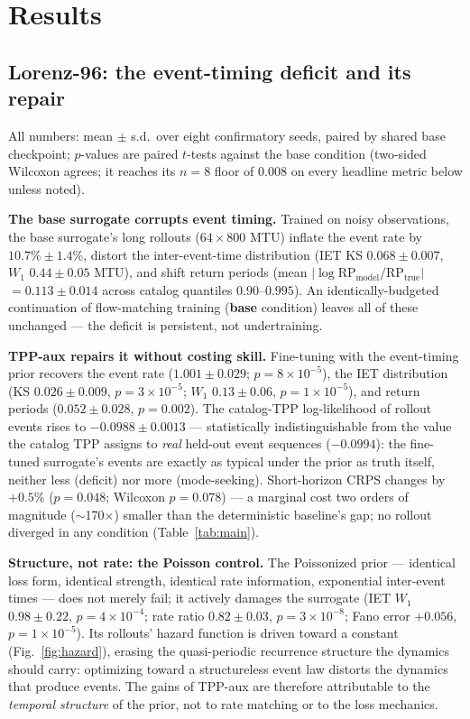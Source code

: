 \documentclass[11pt]{article}
\begin{document}
\section{Results}
\label{sec:results}

\subsection{Lorenz-96: the event-timing deficit and its repair}

All numbers: mean $\pm$ s.d.\ over eight confirmatory seeds, paired by
shared base checkpoint; $p$-values are paired $t$-tests against the base
condition (two-sided Wilcoxon agrees; it reaches its $n{=}8$ floor of
$0.008$ on every headline metric below unless noted).

\textbf{The base surrogate corrupts event timing.} Trained on noisy
observations, the base surrogate's long rollouts ($64 \times 800$ MTU)
inflate the event rate by $10.7\% \pm 1.4\%$, distort the inter-event-time
distribution (IET KS $0.068 \pm 0.007$, $W_1$ $0.44 \pm 0.05$ MTU), and
shift return periods (mean $|\log \mathrm{RP}_{\mathrm{model}} /
\mathrm{RP}_{\mathrm{true}}|$ $= 0.113 \pm 0.014$ across catalog quantiles
$0.90$--$0.995$). An identically-budgeted continuation of flow-matching
training (\textbf{base} condition) leaves all of these unchanged --- the
deficit is persistent, not undertraining.

\textbf{TPP-aux repairs it without costing skill.} Fine-tuning with the
event-timing prior recovers the event rate ($1.001 \pm 0.029$;
$p=8\!\times\!10^{-5}$), the IET distribution (KS $0.026 \pm 0.009$,
$p=3\!\times\!10^{-5}$; $W_1$ $0.13 \pm 0.06$, $p=1\!\times\!10^{-5}$),
and return periods ($0.052 \pm 0.028$, $p=0.002$). The catalog-TPP
log-likelihood of rollout events rises to $-0.0988 \pm 0.0013$ ---
statistically indistinguishable from the value the catalog TPP assigns to
\emph{real} held-out event sequences ($-0.0994$): the fine-tuned
surrogate's events are exactly as typical under the prior as truth itself,
neither less (deficit) nor more (mode-seeking). Short-horizon CRPS changes
by $+0.5\%$ ($p=0.048$; Wilcoxon $p=0.078$) --- a marginal cost two
orders of magnitude ($\sim$170$\times$) smaller than the deterministic
baseline's gap; no rollout diverged in any condition
(Table~\ref{tab:main}).

\textbf{Structure, not rate: the Poisson control.} The Poissonized prior
--- identical loss form, identical strength, identical rate information,
exponential inter-event times --- does not merely fail; it actively damages
the surrogate (IET $W_1$ $0.98 \pm 0.22$, $p=4\!\times\!10^{-4}$; rate
ratio $0.82 \pm 0.03$, $p=3\!\times\!10^{-8}$; Fano error $+0.056$,
$p=1\!\times\!10^{-5}$). Its rollouts' hazard function is driven toward a
constant (Fig.~\ref{fig:hazard}), erasing the quasi-periodic recurrence
structure the dynamics should carry: optimizing toward a structureless
event law distorts the dynamics that produce events. The gains of TPP-aux
are therefore attributable to the \emph{temporal structure} of the prior,
not to rate matching or to the loss mechanics.
\end{document}
